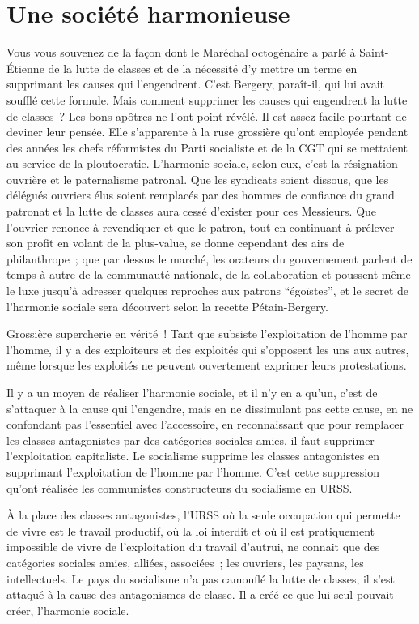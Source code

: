 \documentclass[french,twoside]{book} %
\begin{document}
\section[Une société harmonieuse]{Une société harmonieuse}
\noindent Vous vous souvenez de la façon dont le Maréchal octogénaire a parlé à Saint-Étienne de la lutte de classes et de la nécessité d’y mettre un terme en supprimant les causes qui l’engendrent. C’est Bergery, paraît-il, qui lui avait soufflé cette formule. Mais comment supprimer les causes qui engendrent la lutte de classes ? Les bons apôtres ne l’ont point révélé. Il est assez facile pourtant de deviner leur pensée. Elle s’apparente à la ruse grossière qu’ont employée pendant des années les chefs réformistes du Parti socialiste et de la CGT qui se mettaient au service de la ploutocratie. L’harmonie sociale, selon eux, c’est la résignation ouvrière et le paternalisme patronal. Que les syndicats soient dissous, que les délégués ouvriers élus soient remplacés par des hommes de confiance du grand patronat et la lutte de classes aura cessé d’exister pour ces Messieurs. Que l’ouvrier renonce à revendiquer et que le patron, tout en continuant à prélever son profit en volant de la plus-value, se donne cependant des airs de philanthrope ; que par dessus le marché, les orateurs du gouvernement parlent de temps à autre de la communauté nationale, de la collaboration et poussent même le luxe jusqu’à adresser quelques reproches aux patrons “égoïstes”, et le secret de l’harmonie sociale sera découvert selon la recette Pétain-Bergery.\par
Grossière supercherie en vérité ! Tant que subsiste l’exploitation de l’homme par l’homme, il y a des exploiteurs et des exploités qui s’opposent les uns aux autres, même lorsque les exploités ne peuvent ouvertement exprimer leurs protestations.\par
Il y a un moyen de réaliser l’harmonie sociale, et il n’y en a qu’un, c’est de s’attaquer à la cause qui l’engendre, mais en ne dissimulant pas cette cause, en ne confondant pas l’essentiel avec l’accessoire, en reconnaissant que pour remplacer les classes antagonistes par des catégories sociales amies, il faut supprimer l’exploitation capitaliste. Le socialisme supprime les classes antagonistes en supprimant l’exploitation de l’homme par l’homme. C’est cette suppression qu’ont réalisée les communistes constructeurs du socialisme en URSS.\par
À la place des classes antagonistes, l’URSS où la seule occupation qui permette de vivre est le travail productif, où la loi interdit et où il est pratiquement impossible de vivre de l’exploitation du travail d’autrui, ne connait que des catégories sociales amies, alliées, associées ; les ouvriers, les paysans, les intellectuels. Le pays du socialisme n’a pas camouflé la lutte de classes, il s’est attaqué à la cause des antagonismes de classe. Il a créé ce que lui seul pouvait créer, l’harmonie sociale.
\end{document}
